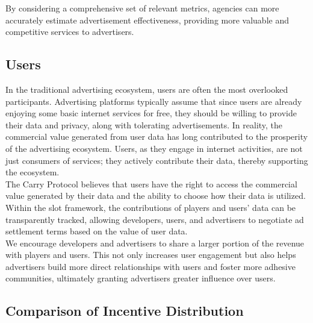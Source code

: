By considering a comprehensive set of relevant metrics, agencies can more accurately estimate advertisement effectiveness, providing more valuable and competitive services to advertisers.




\subsection{Users}
In the traditional advertising ecosystem, users are often the most overlooked participants. Advertising platforms typically assume that since users are already enjoying some basic internet services for free, they should be willing to provide their data and privacy, along with tolerating advertisements. In reality, the commercial value generated from user data has long contributed to the prosperity of the advertising ecosystem. Users, as they engage in internet activities, are not just consumers of services; they actively contribute their data, thereby supporting the ecosystem.\\

The Carry Protocol believes that users have the right to access the commercial value generated by their data and the ability to choose how their data is utilized. Within the slot framework, the contributions of players and users' data can be transparently tracked, allowing developers, users, and advertisers to negotiate ad settlement terms based on the value of user data.\\

We encourage developers and advertisers to share a larger portion of the revenue with players and users. This not only increases user engagement but also helps advertisers build more direct relationships with users and foster more adhesive communities, ultimately granting advertisers greater influence over users.


\subsection{Comparison of Incentive Distribution}


